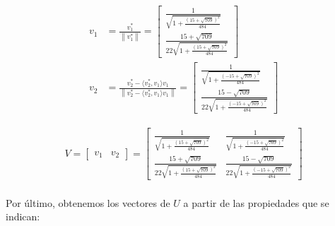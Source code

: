 \documentclass[a4paper, spanish]{article}
\newcommand{\norm}[1]{\left\lVert#1\right\rVert}
\begin{document}
  \begin{align}
    v_1 &= \frac{v_1^*}{\norm{v_1^*}} =
    \begin{bmatrix}
      \frac{1}{\sqrt{1 + \frac{(15 + \sqrt{709})^2}{484}}} \\
      \frac{15 + \sqrt{709}}{22\sqrt{1 + \frac{(15 + \sqrt{709})^2}{484}}}
    \end{bmatrix} \\
    v_2 &= \frac{v_2^* - \langle v_2^*,v_1 \rangle v_1}{\norm{v_2^* - \langle v_2^*,v_1 \rangle v_1}} =
    \begin{bmatrix}
      \frac{1}{\sqrt{1 + \frac{(- 15 + \sqrt{709})^2}{484}}} \\
      \frac{15 - \sqrt{709}}{22\sqrt{1 + \frac{(- 15 + \sqrt{709})^2}{484}}}
    \end{bmatrix}
  \end{align}


  \begin{align}
    V =
    \begin{bmatrix}
      v_1 & v_2
    \end{bmatrix} =
    \begin{bmatrix}
      \frac{1}{\sqrt{1 + \frac{(15 + \sqrt{709})^2}{484}}} & \frac{1}{\sqrt{1 + \frac{(- 15 + \sqrt{709})^2}{484}}}  \\
      \frac{15 + \sqrt{709}}{22\sqrt{1 + \frac{(15 + \sqrt{709})^2}{484}}} & \frac{15 - \sqrt{709}}{22\sqrt{1 + \frac{(- 15 + \sqrt{709})^2}{484}}}
    \end{bmatrix}
  \end{align}

  \paragraph{}
  Por último, obtenemos los vectores de $U$ a partir de las propiedades que se indican:
\end{document}
